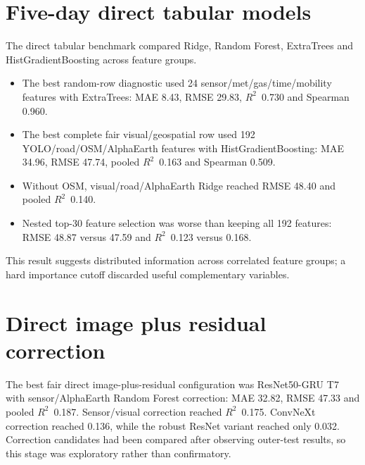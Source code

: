 \documentclass[11pt,a4paper,oneside]{report}
\newcommand{\Rtwo}{$R^2$}
\begin{document}
\section{Five-day direct tabular models}
The direct tabular benchmark compared Ridge, Random Forest, ExtraTrees and
HistGradientBoosting across feature groups.
\begin{itemize}
  \item The best random-row diagnostic used 24 sensor/met/gas/time/mobility
        features with ExtraTrees: MAE 8.43, RMSE 29.83, \Rtwo\ 0.730 and
        Spearman 0.960.
  \item The best complete fair visual/geospatial row used 192
        YOLO/road/OSM/AlphaEarth features with HistGradientBoosting: MAE 34.96,
        RMSE 47.74, pooled \Rtwo\ 0.163 and Spearman 0.509.
  \item Without OSM, visual/road/AlphaEarth Ridge reached RMSE 48.40 and pooled
        \Rtwo\ 0.140.
  \item Nested top-30 feature selection was worse than keeping all 192
        features: RMSE 48.87 versus 47.59 and \Rtwo\ 0.123 versus 0.168.
\end{itemize}
This result suggests distributed information across correlated feature groups;
a hard importance cutoff discarded useful complementary variables.

\section{Direct image plus residual correction}
The best fair direct image-plus-residual configuration was ResNet50-GRU T7 with
sensor/AlphaEarth Random Forest correction: MAE 32.82, RMSE 47.33 and pooled
\Rtwo\ 0.187. Sensor/visual correction reached \Rtwo\ 0.175. ConvNeXt correction
reached 0.136, while the robust ResNet variant reached only 0.032. Correction
candidates had been compared after observing outer-test results, so this stage
was exploratory rather than confirmatory.
\end{document}
